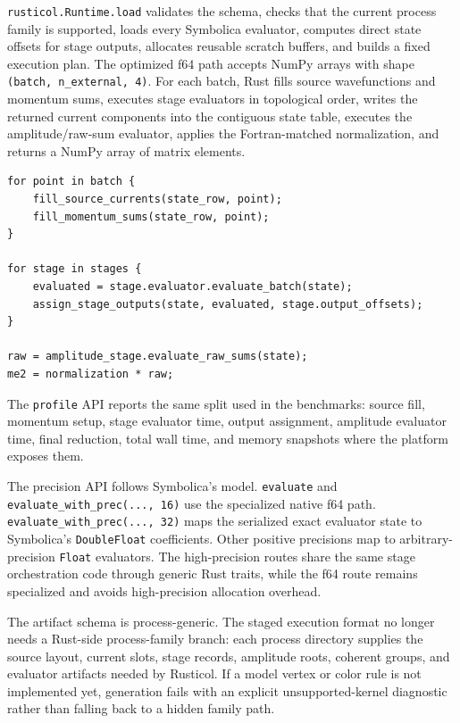 \documentclass[10pt]{article}
\begin{document}
\texttt{rusticol.Runtime.load} validates the schema, checks that the current
process family is supported, loads every Symbolica evaluator, computes direct
state offsets for stage outputs, allocates reusable scratch buffers, and builds
a fixed execution plan.  The optimized f64 path accepts NumPy arrays with shape
\texttt{(batch, n\_external, 4)}.  For each batch, Rust fills source
wavefunctions and momentum sums, executes stage evaluators in topological order,
writes the returned current components into the contiguous state table, executes
the amplitude/raw-sum evaluator, applies the Fortran-matched normalization, and
returns a NumPy array of matrix elements.
\begin{lstlisting}
for point in batch {
    fill_source_currents(state_row, point);
    fill_momentum_sums(state_row, point);
}

for stage in stages {
    evaluated = stage.evaluator.evaluate_batch(state);
    assign_stage_outputs(state, evaluated, stage.output_offsets);
}

raw = amplitude_stage.evaluate_raw_sums(state);
me2 = normalization * raw;
\end{lstlisting}
The \texttt{profile} API reports the same split used in the benchmarks: source
fill, momentum setup, stage evaluator time, output assignment, amplitude
evaluator time, final reduction, total wall time, and memory snapshots where the
platform exposes them.

The precision API follows Symbolica's model.  \texttt{evaluate} and
\texttt{evaluate\_with\_prec(..., 16)} use the specialized native f64 path.
\texttt{evaluate\_with\_prec(..., 32)} maps the serialized exact evaluator state
to Symbolica's \texttt{DoubleFloat} coefficients.  Other positive precisions map
to arbitrary-precision \texttt{Float} evaluators.  The high-precision routes
share the same stage orchestration code through generic Rust traits, while the
f64 route remains specialized and avoids high-precision allocation overhead.

The artifact schema is process-generic.  The staged execution format no longer
needs a Rust-side process-family branch: each process directory supplies the
source layout, current slots, stage records, amplitude roots, coherent groups,
and evaluator artifacts needed by Rusticol.  If a model vertex or color rule is
not implemented yet, generation fails with an explicit unsupported-kernel
diagnostic rather than falling back to a hidden family path.





\end{document}
